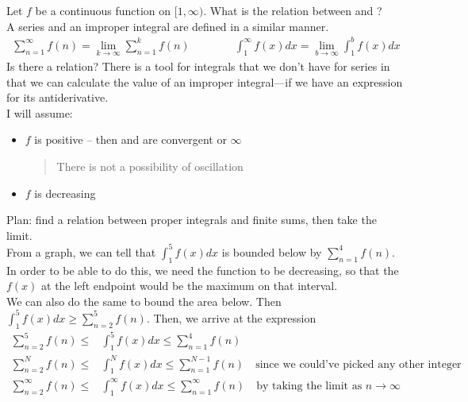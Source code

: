 \documentclass[../13.tex]{subfiles}
\begin{document}
Let \(f\) be a continuous function on \([1, \infty)\). What is the relation between  and ? \\
A series and an improper integral are defined in a similar manner.
\begin{align*}
    \sum_{n = 1}^{\infty} f(n) = \lim_{k\to\infty} \sum_{n = 1}^{k} f(n) \qquad \qquad \int_{1}^{\infty} {f(x)} dx = \lim_{b\to\infty} \int_{1}^{b} {f(x)} dx
\end{align*}
Is there a relation? There is a tool for integrals that we don't have for series in that we can calculate the value of an improper integral---if we have an expression for its antiderivative. \\
I will assume: \begin{itemize}
    \item \(f\) is positive -- then  and  are convergent or \(\infty\) \begin{quote}
              There is not a possibility of oscillation
          \end{quote}
    \item \(f\) is decreasing
\end{itemize}
Plan: find a relation between proper integrals and finite sums, then take the limit. \\
From a graph, we can tell that \(\int_{1}^{5} {f(x)} dx\) is bounded below by \(\sum_{n = 1}^{4} f(n)\). In order to be able to do this, we need the function to be decreasing, so that the \(f(x)\) at the left endpoint would be the maximum on that interval. \\
We can also do the same to bound the area below. Then \(\int_{1}^{5} {f(x)} dx \geq \sum_{n = 2}^{5} f(n)\). Then, we arrive at the expression \begin{align*}
    \sum_{n = 2}^{5} f(n) \leq      & \int_{1}^{5} {f(x)} dx \leq \sum_{n = 1}^{4} f(n)                                                                                                        \\
    \sum_{n = 2}^{N} f(n) \leq      & \int_{1}^{N} {f(x)} dx \leq \sum_{n = 1}^{N-1} f(n) \quad \text{since we could've picked any other integer}                                              \\
    \sum_{n = 2}^{\infty} f(n) \leq & \int_{1}^{\infty} {f(x)} dx \leq \sum_{n = 1}^{\infty} f(n)                                            \quad \text{by taking the limit as } n \to \infty \\
\end{align*}
\end{document}
